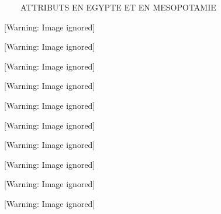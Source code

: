 \documentclass{article}
\title{}
\begin{document}
\ \ \ \ ATTRIBUTS EN EGYPTE ET EN MESOPOTAMIE\ \ 

\begin{center}
 [Warning: Image ignored] %

\end{center}
\begin{center}
 [Warning: Image ignored] %

\end{center}
\begin{center}
 [Warning: Image ignored] %

\end{center}
\begin{center}
 [Warning: Image ignored] %

\end{center}
\begin{center}
 [Warning: Image ignored] %

\end{center}
\begin{center}
 [Warning: Image ignored] %

\end{center}
\begin{center}
 [Warning: Image ignored] %

\end{center}
\begin{center}
 [Warning: Image ignored] %

\end{center}
\begin{center}
 [Warning: Image ignored] %

\end{center}
\begin{center}
 [Warning: Image ignored] %

\end{center}
\end{document}
